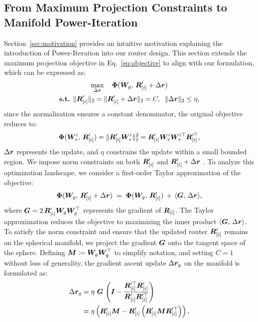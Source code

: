\documentclass[11pt]{article}
\begin{document}
\subsection{From Maximum Projection Constraints to Manifold Power-Iteration}
\label{sec:update}
Section~\ref{sec:motivation} provides an intuitive motivation explaining the introduction of Power-Iteration into our router design.
This section extends the maximum projection objective in Eq.~\ref{eq:objective} to align with our formulation, which can be expressed as:
\begin{gather}
    \max_{\Delta {\bm{r}}} \quad \bm{\Phi}({\bm{W}}_g, \, {\bm{R}}_{[i]}^\prime + \Delta {\bm{r}}) \\
    \mathrm{\textbf{s.t.}} \,\; \|{\bm{R}}_{[i]}^\prime\|_2 = \|{\bm{R}}_{[i]}^\prime + \Delta {\bm{r}}\|_2 = C, \;\; \|\Delta {\bm{r}}\|_2 \le \eta, \nonumber
\end{gather}
since the normalization ensures a constant denominator, the original objective reduces to:
\[
    \bm{\Phi}({\bm{W}}_{*}^i, \, {\bm{R}}_{[i]}^\prime) = \|{\bm{R}}_{[i]}^\prime{\bm{W}}_*^i\|_2^2 = {\bm{R}}_{[i]}^\prime{\bm{W}}_*^i{\bm{W}}_*^{i\top}{\bm{R}}_{[i]}^{\prime\top},
\]
$\Delta {\bm{r}}$ represents the update, and $\eta$ constrains the update within a small bounded region. 
We impose norm constraints on both ${\bm{R}}_{[i]}^\prime$ and ${\bm{R}}_{[i]}^\prime + \Delta {\bm{r}}$ .
To analyze this optimization landscape, we consider a first-order Taylor approximation of the objective:
\begin{equation*}
    \bm{\Phi}({\bm{W}}_g, \, {\bm{R}}_{[i]}^\prime + \Delta {\bm{r}}) \; = \; \bm{\Phi}({\bm{W}}_g, \, {\bm{R}}_{[i]}^\prime)  \, + \, \langle {\bm{G}}, \, \Delta {\bm{r}} \rangle,
\end{equation*}
where ${\bm{G}} = 2 \, {\bm{R}}_{[i]}^\prime {\bm{W}}_g {\bm{W}}_g^\top$ represents the gradient of ${\bm{R}}_{[i]}$.
The Taylor approximation reduces the objective to maximizing the inner product $\langle {\bm{G}}, \, \Delta {\bm{r}} \rangle$.
To satisfy the norm constraint and ensure that the updated router ${\bm{R}}_{[i]}^\prime$ remains on the spherical manifold, we project the gradient ${\bm{G}}$ onto the tangent space of the sphere. 
Defining ${\bm{M}} \coloneqq {\bm{W}}_g{\bm{W}}_g^\top$ to simplify notation, and setting $C = 1$ without loss of generality, the gradient ascent update $\Delta {\bm{r}}_{g}$ on the manifold is formulated as:
\begin{align}
    \Delta {\bm{r}}_{g} &= \eta \,\, {\bm{G}} \, \left( {\bm{I}} - \frac{{\bm{R}}_{[i]}^{\prime\top}{\bm{R}}_{[i]}^\prime}{{\bm{R}}_{[i]}^\prime{\bm{R}}_{[i]}^{\prime\top}}  \right) \nonumber \\
        &= \eta \left( {\bm{R}}_{[i]}^\prime{\bm{M}} - {\bm{R}}_{[i]}^\prime \left({\bm{R}}_{[i]}^\prime {\bm{M}}{\bm{R}}_{[i]}^{\prime\top}\right) \right), 
\end{align}
\end{document}
